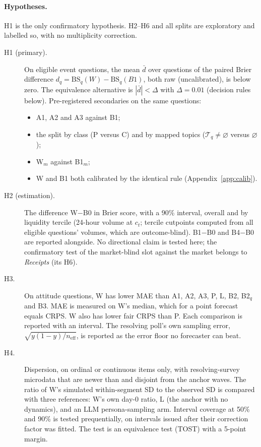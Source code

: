 \documentclass[11pt]{article}
\begin{document}
\paragraph{Hypotheses.} H1 is the only confirmatory hypothesis. H2--H6 and all splits are exploratory and labelled so, with no multiplicity correction.
\begin{description}
  \item[H1 (primary).] On eligible event questions, the mean $\bar d$ over questions of the paired Brier difference $d_q=\mathrm{BS}_q(W)-\mathrm{BS}_q(B1)$, both raw (uncalibrated), is below zero. The equivalence alternative is $|\bar d|<\Delta$ with $\Delta=0.01$ (decision rules below). Pre-registered secondaries on the same questions:
  \begin{itemize}
    \item A1, A2 and A3 against B1;
    \item the split by class (P versus C) and by mapped topics ($\mathcal{T}_q\neq\varnothing$ versus $\varnothing$);
    \item W$_m$ against B1$_m$;
    \item W and B1 both calibrated by the identical rule (Appendix~\ref{app:calib}).
  \end{itemize}
  \item[H2 (estimation).] The difference W$-$B0 in Brier score, with a 90\% interval, overall and by liquidity tercile (24-hour volume at $c_t$; tercile cutpoints computed from all eligible questions' volumes, which are outcome-blind). B1$-$B0 and B4$-$B0 are reported alongside. No directional claim is tested here; the confirmatory test of the market-blind slot against the market belongs to \emph{Receipts} (its H6).
  \item[H3.] On attitude questions, W has lower MAE than A1, A2, A3, P, L, B2, B2$_q$ and B3. MAE is measured on W's median, which for a point forecast equals CRPS. W also has lower fair CRPS than P. Each comparison is reported with an interval. The resolving poll's own sampling error, $\sqrt{y(1-y)/n_{\mathrm{eff}}}$, is reported as the error floor no forecaster can beat.
  \item[H4.] Dispersion, on ordinal or continuous items only, with resolving-survey microdata that are newer than and disjoint from the anchor waves. The ratio of W's simulated within-segment SD to the observed SD is compared with three references: W's own day-0 ratio, L (the anchor with no dynamics), and an LLM persona-sampling arm. Interval coverage at 50\% and 90\% is tested prequentially, on intervals issued after their correction factor was fitted. The test is an equivalence test (TOST) with a 5-point margin.

\end{description}
\end{document}
